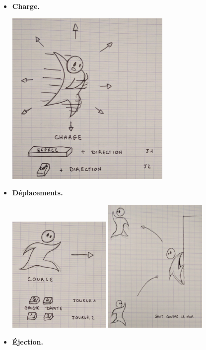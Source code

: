 \documentclass[french]{report}
\begin{document}
\begin{itemize}[label=$\bullet$]
    \item \textbf{Charge.}
    
    \includegraphics[width=8cm]{dash}

    \newpage
    \item \textbf{Déplacements.}
    
    \includegraphics[width=5cm]{run}
    \includegraphics[width=5cm]{wall_jump}

    \item \textbf{Éjection.}
    

\end{itemize}
\end{document}
